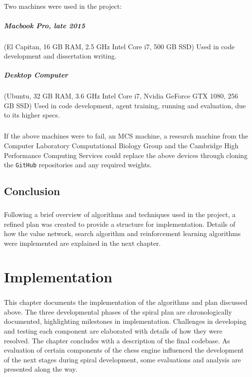 \documentclass[12pt,a4paper]{book}
\begin{document}
\paragraph{} Two machines were used in the project:

\paragraph{Macbook Pro, late 2015} (El Capitan, 16 GB RAM, 2.5 GHz Intel Core i7, 500 GB SSD) Used in code development and dissertation writing.

\paragraph{Desktop Computer} (Ubuntu, 32 GB RAM, 3.6 GHz Intel Core i7, Nvidia GeForce GTX 1080, 256 GB SSD) Used in code development, agent training, running and evaluation, due to its higher specs.

\paragraph{} If the above machines were to fail, an MCS machine, a research machine from the Computer Laboratory Computational Biology Group and the Cambridge High Performance Computing Services could replace the above devices through cloning the \texttt{GitHub} repositories and any required weights.

\section{Conclusion}

\paragraph{} Following a brief overview of algorithms and techniques used in the project, a refined plan was created to provide a structure for implementation. Details of how the value network, search algorithm and reinforcement learning algorithms were implemented are explained in the next chapter.


\chapter{Implementation}

\paragraph{} This chapter documents the implementation of the algorithms and plan discussed above. The three developmental phases of the spiral plan are chronologically documented, highlighting milestones in implementation. Challenges in developing and testing each component are elaborated with details of how they were resolved. The chapter concludes with a description of the final codebase. As evaluation of certain components of the chess engine influenced the development of the next stages during spiral development, some evaluations and analysis are presented along the way.
\end{document}
